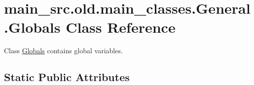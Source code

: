 \hypertarget{classmain__src_8old_1_1main__classes_1_1General_1_1Globals}{\section{main\-\_\-src.\-old.\-main\-\_\-classes.\-General.\-Globals Class Reference}
\label{classmain__src_8old_1_1main__classes_1_1General_1_1Globals}
}


Class \hyperlink{classmain__src_8old_1_1main__classes_1_1General_1_1Globals}{Globals} contains global variables.  


\subsection*{Static Public Attributes}
